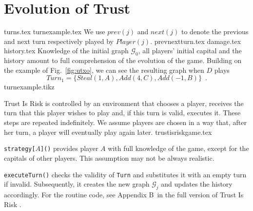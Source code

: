 \section{Evolution of Trust}
  {turns.tex}
  \ifdefined\proceedings
  \else
    {turnexample.tex}
    We use $prev\left(j\right)$ and $next\left(j\right)$ to denote the previous and next turn respectively played by
    $Player(j)$.
  \fi
  {prevnextturn.tex}
  {damage.tex}
  {history.tex}
  \noindent Knowledge of the initial graph $\mathcal{G}_0$, all players' initial capital and the history amount to full
  comprehension of the evolution of the game. Building on the example of Fig.~\ref{fig:utxo}, we can see the resulting graph
  when $D$ plays
  \begin{equation}
  \label{turnexample}
     Turn_1 = \{Steal\left(1, A\right), Add\left(4, C\right), Add\left(-1, B\right)\} \enspace.
  \end{equation}
  {turnexample.tikz}

  \noindent Trust Is Risk is controlled by an environment that chooses a player, receives the turn that this player wishes to
  play and, if this turn is valid, executes it. These steps are repeated indefinitely. We assume players are chosen in a way
  that, after her turn, a player will eventually play again later.
  {trustisriskgame.tex}

  \noindent \texttt{strategy[}$A$\texttt{]()} provides player $A$ with full knowledge of the game, except for the capitals of
  other players. This assumption may not be always realistic.

  \texttt{executeTurn()} checks the validity of \texttt{Turn} and substitutes it with an empty turn if invalid.
  Subsequently, it creates the new graph $\mathcal{G}_j$ and updates the history accordingly. For the routine code,
  see Appendix B\ifdefined\proceedings \ in the full version of Trust Is Risk \cite{trustisrisk}\fi.
